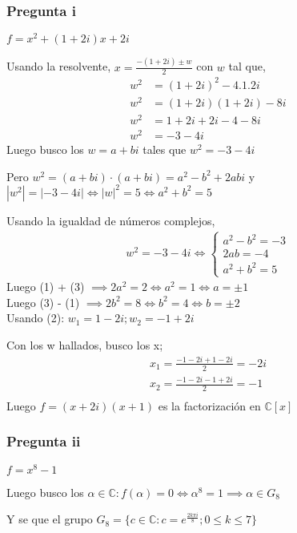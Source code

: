 \subsubsection{Pregunta i}

$ f = x^2 + (1+2i)x + 2i $

Usando la resolvente, $ x = \frac{-(1+2i) \pm w}{2} $ con $w$ tal que,
\begin{align*}
    w^2 &= (1+2i)^2 - 4.1.2i \\
    w^2 &= (1+2i)(1+2i) - 8i \\
    w^2 &= 1+2i+2i-4 - 8i \\
    w^2 &= -3-4i
\end{align*}
Luego busco los $ w = a+bi $ tales que $ w^2 = -3-4i $

Pero $ w^2 = (a+bi) \cdot (a+bi) = a^2 - b^2 + 2abi $ y \\
$ |w^2| = |-3-4i| \iff |w|^2 = 5 \iff a^2 + b^2 = 5$

Usando la igualdad de números complejos,
\begin{align*}
    w^2 = -3-4i \iff \begin{cases}
        a^2 - b^2 = -3 \\
        2ab = -4 \\
        a^2 + b^2 = 5
    \end{cases}
\end{align*}
Luego (1) + (3) $ \implies 2a^2 = 2 \iff a^2 = 1 \iff a = \pm 1 $ \\
Luego (3) - (1) $ \implies 2b^2 = 8 \iff b^2 = 4 \iff b = \pm 2 $ \\

Usando (2): $ w_1 = 1-2i; w_2 = -1+2i $

Con los w hallados, busco los x;
\begin{align*}
    x_1 = \frac{-1-2i + 1 - 2i}{2} = -2i \\
    x_2 = \frac{-1-2i - 1 + 2i}{2} = -1 \\
\end{align*}
Luego $ f = (x+2i)(x+1) $ es la factorización en $ \mathbb{C}[x] $

\subsubsection{Pregunta ii}
$ f = x^8 - 1 $

Luego busco los $ \alpha \in \mathbb{C}: f(\alpha) = 0 \iff \alpha^8 = 1 \implies \alpha \in G_8 $

Y se que el grupo $ G_8 = \{ c \in \mathbb{C}: c = e^{\frac{2k\pi i}{8}}; 0 \leq k \leq 7 \} $

